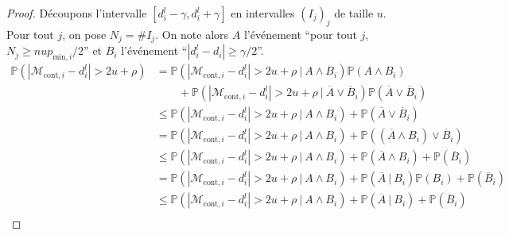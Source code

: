 \begin{proof}
    Découpons l'intervalle \([d_i^l - \gamma, d_i^l + \gamma]\) en intervalles \((I_j)_j\) de taille \(u\). Pour tout \(j\), on pose \(N_j = \#I_j\). On note alors \(A\) l'événement ``pour tout \(j\), \(N_j \geq nup_{\text{min}, i}/2\)'' et \(B_i\) l'événement ``\(|d_i^l - d_i| \geq \gamma/2\)''.\\
    \begin{align*}
        \mathbb P\left( |\mathcal M_{\text{cont}, i} - d_i^l| > 2u + \rho \right) & = \mathbb P\left( |\mathcal M_{\text{cont}, i} - d_i^l| > 2u + \rho \ | \ A \wedge B_i\right)\mathbb P\left( A \wedge B_i \right)\\
        & \quad \quad  + \mathbb P\left( |\mathcal M_{\text{cont}, i} - d_i^l| > 2u + \rho \ | \ \overline A \vee \overline B_i\right) \mathbb P \left( \overline A \vee \overline B_i \right)\\
        & \leq \mathbb P\left( |\mathcal M_{\text{cont}, i} - d_i^l| > 2u + \rho \ | \ A \wedge B_i\right) +   \mathbb P \left( \overline A \vee \overline B_i \right)\\
        & = \mathbb P\left( |\mathcal M_{\text{cont}, i} - d_i^l| > 2u + \rho \ | \ A \wedge B_i\right) +   \mathbb P \left( (\overline A \wedge B_i) \vee \overline B_i \right)\\
        & \leq \mathbb P\left( |\mathcal M_{\text{cont}, i} - d_i^l| > 2u + \rho \ | \ A \wedge B_i\right) +   \mathbb P \left( \overline A \wedge B_i\right) + \mathbb P \left( \overline B_i \right)\\
        & = \mathbb P\left( |\mathcal M_{\text{cont}, i} - d_i^l| > 2u + \rho \ | \ A \wedge B_i\right) +   \mathbb P \left( \overline A \ |\ B_i\right)\mathbb P (B_i) + \mathbb P \left( \overline B_i \right)\\
        & \leq \mathbb P\left( |\mathcal M_{\text{cont}, i} - d_i^l| > 2u + \rho \ | \ A \wedge B_i\right) +   \mathbb P \left( \overline A \ |\ B_i\right) + \mathbb P \left( \overline B_i \right)\\
    \end{align*}


\end{proof}
